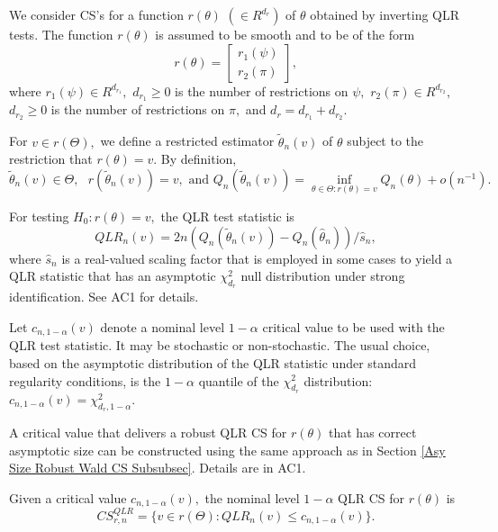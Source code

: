 \documentclass[12pt,titlepage,final,oneside,letterpaper]{article}
\begin{document}
We consider CS's for a function $r(\theta )$ $(\in R^{d_{r}})$ of $\theta $
obtained by inverting QLR tests. The function $r(\theta )$ is assumed to be
smooth and to be of the form%
\begin{equation}
r(\theta )=\left[ 
\begin{array}{c}
r_{1}(\psi ) \\ 
r_{2}(\pi )%
\end{array}%
\right] ,  \label{Form of r(theta)}
\end{equation}%
where $r_{1}(\psi )\in R^{d_{r_{1}}},$ $d_{r_{1}}\geq 0$ is the number of
restrictions on $\psi ,$ $r_{2}(\pi )\in R^{d_{r_{2}}},$ $d_{r_{2}}\geq 0$
is the number of restrictions on $\pi ,$ and $d_{r}=d_{r_{1}}+d_{r_{2}}.$

For $v\in r(\Theta ),$ we define a restricted estimator $\widetilde{\theta }%
_{n}(v)$ of $\theta $ subject to the restriction that $r(\theta )=v.$ By
definition, 
\begin{equation}
\widetilde{\theta }_{n}(v)\in \Theta ,\text{ }r(\widetilde{\theta }%
_{n}(v))=v,\text{ and }Q_{n}(\widetilde{\theta }_{n}(v))=\inf_{\theta \in
\Theta :r(\theta )=v}Q_{n}(\theta )+o(n^{-1}).
\end{equation}

For testing $H_{0}:r(\theta )=v,$ the QLR test statistic is%
\begin{equation}
QLR_{n}(v)=2n(Q_{n}(\widetilde{\theta }_{n}(v))-Q_{n}(\widehat{\theta }%
_{n}))/\widehat{s}_{n},  \label{Defn QLR Test Statistic}
\end{equation}%
where $\widehat{s}_{n}$ is a real-valued scaling factor that is employed in
some cases to yield a QLR statistic that has an asymptotic $\chi
_{d_{r}}^{2} $ null distribution under strong identification. See AC1 for
details.

Let $c_{n,1-\alpha }(v)$ denote a nominal level $1-\alpha $ critical value
to be used with the QLR test statistic. It may be stochastic or
non-stochastic. The usual choice, based on the asymptotic distribution of
the QLR statistic under standard regularity conditions, is the $1-\alpha $
quantile of the $\chi _{d_{r}}^{2}$ distribution: $c_{n,1-\alpha }(v)=\chi
_{d_{r},1-\alpha }^{2}.$

A critical value that delivers a robust QLR CS for $r(\theta )$ that has
correct asymptotic size can be constructed using the same approach as in
Section \ref{Asy Size Robust Wald CS Subsubsec}. Details are in AC1.

Given a critical value $c_{n,1-\alpha }(v),$ the nominal level $1-\alpha $
QLR CS for $r(\theta )$ is 
\begin{equation}
CS_{r,n}^{QLR}=\{v\in r(\Theta ):QLR_{n}(v)\leq c_{n,1-\alpha }(v)\}.
\label{Defn of QLR CS}
\end{equation}
\end{document}
